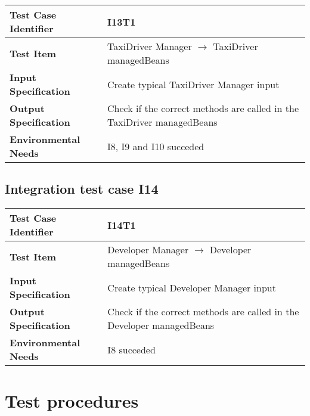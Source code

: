 \begin{table}[!htbp]
\begin{center}
\begin{tabular}[t]{p{}|p{}}

\hline
\textbf{Test Case Identifier} & I13T1 \\
\hline
\textbf{Test Item} & TaxiDriver Manager $\rightarrow$ TaxiDriver managedBeans \\
\hline
\textbf{Input Specification} & Create typical TaxiDriver Manager input  \\
\hline
\textbf{Output Specification} & Check if the correct methods are called in the TaxiDriver managedBeans \\
\hline
\textbf{Environmental Needs} & I8, I9 and I10 succeded \\
\hline

\end{tabular}
\end{center}
\end{table}

\subsection{Integration test case I14}

\begin{table}[!htbp]
\begin{center}
\begin{tabular}[t]{p{}|p{}}

\hline
\textbf{Test Case Identifier} & I14T1 \\
\hline
\textbf{Test Item} & Developer Manager $\rightarrow$ Developer managedBeans \\
\hline
\textbf{Input Specification} & Create typical Developer Manager input  \\
\hline
\textbf{Output Specification} & Check if the correct methods are called in the Developer managedBeans \\
\hline
\textbf{Environmental Needs} & I8 succeded \\
\hline

\end{tabular}
\end{center}
\end{table}
\clearpage

\section{Test procedures}

